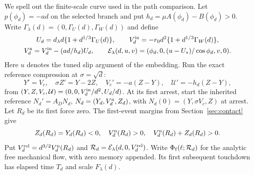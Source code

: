 We spell out the finite-scale curve used in the path comparison.
Let $p(\phi_d)=-ad$ on the selected branch and put
$h_d=\mu A(\phi_d)-B(\phi_d)>0$. Write
$\Gamma_\lambda(d)=(0,\Gamma_U(d),\Gamma_W(d))$ and define
\begin{equation}
 \begin{gathered}
 U_d=d_\lambda d\{1+d^{1/3}\Gamma_U(d)\},\qquad
 V_d^{\rm in}=-r_0d^2\{1+d^{1/3}\Gamma_W(d)\},\\
 V_d^{\rm a}=V_d^{\rm in}-(ad/h_d)U_d,\qquad
 \mathcal E_\lambda(d,u,v)
     =(\phi_d,0,(u-U_*)/\cos\phi_d,v,0).
 \end{gathered}\label{gr:embedding}
\end{equation}
Here $u$ denotes the tuned slip argument of the embedding. Run the exact
reference compression at $\sigma=\sqrt d$:
\begin{equation}
 Y'=V_c,\quad \sigma Z'=Y-2Z,\quad
 V_c'=-a(Z-Y),\quad \mathcal U'=-h_d(Z-Y),
 \label{gr:compression}
\end{equation}
from $(Y,Z,V_c,\mathcal U)=(0,0,V_d^{\rm in}/d^2,U_d/d)$.
At its first arrest, start the inherited reference
$N_d'=A_DN_d$, $N_d=(Y_d,V_d^{\rm n},Z_d)$, with
$N_d(0)=(Y,\sigma V_c,Z)$ at arrest. Let $R_d$ be its first
force zero. The first-event margins from Section~\ref{sec:contact} give
\begin{equation}
 Z_d(R_d)=Y_d(R_d)<0,\quad V_d^{\rm n}(R_d)>0,\quad
 V_d^{\rm n}(R_d)+Z_d(R_d)>0.
 \label{gr:release-signs}
\end{equation}
Put $V_d^{\rm rel}=d^{3/2}V_d^{\rm n}(R_d)$ and
$\mathcal R_d=\mathcal E_\lambda(d,0,V_d^{\rm rel})$.
Write $\Phi_{\rm f}(\ell;\mathcal R_d)$ for the analytic free
mechanical flow, with zero memory appended. Its first subsequent
touchdown has elapsed time $T_d$ and scale $F_\lambda(d)$.

